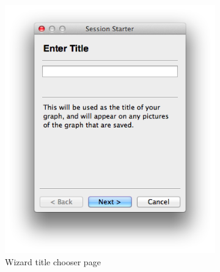 \begin{figure}[h!]
    \centering
    \begin{subfigure}[b]{0.4\textwidth}
        \centering
        \includegraphics[width=\textwidth]{images/wizard_page_1.png}
        \caption{Wizard title chooser page}
        \label{fig:page_1}
    \end{subfigure}
    \begin{subfigure}[b]{0.4\textwidth}
        \centering

\end{subfigure}
\end{figure}
